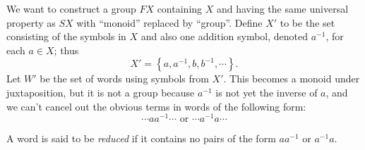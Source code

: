 We want to construct a group \( FX \) containing \( X \) and having the same universal property as \( SX \) with ``monoid'' replaced by ``group''.
Define \( X' \) to be the set consisting of the symbols in \( X \) and also one addition symbol, denoted \( a^{-1} \), for each \( a \in X \); thus
\[
  X' = \left\lbrace a, a^{-1}, b, b^{-1}, \cdots \right\rbrace.
\]
Let \( W' \) be the set of words using symbols from \( X' \).
This becomes a monoid under juxtaposition, but it is not a group because \( a^{-1} \) is not yet the inverse of \( a \), and we can't cancel out the obvious terms in words of the following form:
\[
  \cdots a a^{-1} \cdots \text{ or } \cdots a^{-1}a \cdots
\]
\begin{definition}
  \label{definition-reduced-word}
  A word is said to be \emph{reduced} if it contains no pairs of the form \( a a^{-1} \) or \( a^{-1} a \).
\end{definition}

